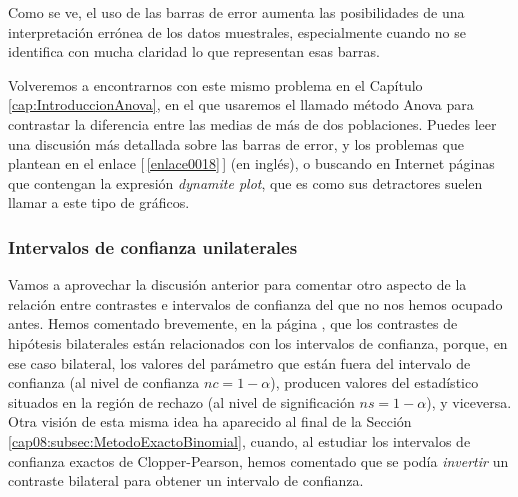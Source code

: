 Como se ve, el uso de las barras de error aumenta las posibilidades de una interpretación errónea
de los datos muestrales, especialmente cuando no se identifica con mucha claridad lo que
representan esas barras.


Volveremos a encontrarnos con este mismo problema en el Capítulo \ref{cap:IntroduccionAnova}, en el
que usaremos el llamado método Anova para contrastar la diferencia entre las medias de más de dos
poblaciones. Puedes leer una discusión más detallada sobre las barras de error, y los problemas que
plantean en el enlace [\,\ref{enlace0018}\,]\label{enlace0018a} (en inglés), o buscando en Internet páginas que contengan la expresión {\em dynamite plot}, que es como sus detractores suelen llamar a este tipo de gráficos.\\

\subsubsection{Intervalos de confianza unilaterales}

Vamos a aprovechar la discusión anterior para comentar otro aspecto de la relación entre contrastes e intervalos de confianza del que no nos hemos ocupado antes. Hemos comentado brevemente, en la página \pageref{cap07:lugar:ContrasteBilateralIntervaloConfianza}, que los contrastes de hipótesis bilaterales están relacionados con los intervalos de confianza, porque, en ese caso bilateral, los valores del parámetro que están fuera del intervalo de confianza (al nivel de confianza $nc=1-\alpha$), producen valores del estadístico situados en la región de rechazo (al nivel de significación $ns=1-\alpha$), y viceversa. Otra visión de esta misma idea ha aparecido al final de la Sección \ref{cap08:subsec:MetodoExactoBinomial}, cuando, al estudiar los intervalos de confianza exactos de Clopper-Pearson, hemos comentado que se podía {\em invertir} un contraste bilateral para obtener un intervalo de confianza.

